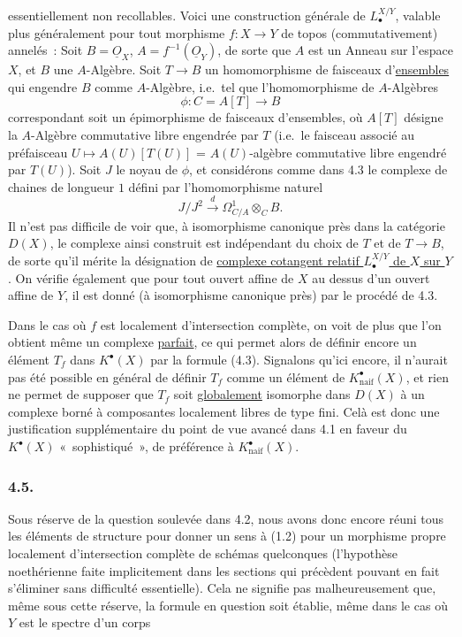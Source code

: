 essentiellement non recollables. Voici une construction g\'en\'erale de $L^{X/Y}_\bullet$, valable plus g\'en\'eralement pour tout morphisme $f:X\to Y$ de topos (commutativement) annel\'es~: Soit $B=\underline O_X$, $A=f^{-1}(\underline O_Y)$, de sorte que $A$ est un Anneau sur l'espace $X$, et $B$ une $A$-Alg\`ebre. Soit $T\to B$ un homomorphisme de faisceaux d'\underline{ensembles} qui engendre $B$ comme $A$-Alg\`ebre, i.e.\ tel que l'homomorphisme de $A$-Alg\`ebres
\[
\phi:C=A[T]\longrightarrow B
\]
correspondant soit un \'epimorphisme de faisceaux d'ensembles, o\`u $A[T]$ d\'esigne la $A$-Alg\`ebre commutative libre engendr\'ee par $T$ (i.e.\ le faisceau associ\'e au pr\'efaisceau $U\longmapsto A(U)[T(U)]$ = $A(U)$-alg\`ebre commutative libre engendr\'e par $T(U)$).
Soit $J$ le noyau de $\phi$, et consid\'erons comme dans 4.3 le complexe de chaines de longueur $1$ d\'efini par l'homomorphisme naturel
\[
J/J^2\xrightarrow{d}\Omega^1_{C/A}\otimes_C B.
\]
Il n'est pas difficile de voir que, \`a isomorphisme canonique pr\`es dans la cat\'egorie $D(X)$, le complexe ainsi construit est ind\'ependant du choix de $T$ et de $T\to B$, de sorte qu'il m\'erite la d\'esignation de \uline{complexe cotangent relatif $L^{X/Y}_\bullet$ de $X$ sur $Y$}. On v\'erifie \'egalement que pour tout ouvert affine de $X$ au dessus d'un ouvert affine de $Y$, il est donn\'e (\`a isomorphisme canonique pr\`es) par le proc\'ed\'e de 4.3.

Dans le cas o\`u $f$ est localement d'intersection compl\`ete, on voit de plus que l'on obtient m\^eme un complexe \underline{parfait}, ce qui permet alors de d\'efinir encore un \'el\'ement $T_f$ dans $K^\bullet(X)$ par la formule (4.3). Signalons qu'ici encore, il n'aurait pas \'et\'e possible en g\'en\'eral de d\'efinir $T_f$ comme un \'el\'ement de $K^\bullet_{\mathrm{naif}}(X)$, et rien ne permet de supposer que $T_f$ soit \underline{globalement} isomorphe dans $D(X)$ \`a un complexe born\'e \`a composantes localement libres de type fini. Cel\`a est donc une justification suppl\'ementaire du point de vue avanc\'e dans 4.1 en faveur du $K^\bullet(X)$ «~sophistiqu\'e~», de pr\'ef\'erence \`a $K^\bullet_{\mathrm{naif}}(X)$.

\subsubsection*{4.5.}
Sous r\'eserve de la question soulev\'ee dans 4.2, nous avons donc encore r\'euni tous les \'el\'ements de structure pour donner un sens \`a (1.2) pour un morphisme propre localement d'intersection compl\`ete de sch\'emas quelconques (l'hypoth\`ese noeth\'erienne faite implicitement dans les sections qui pr\'ec\`edent pouvant en fait s'\'eliminer sans difficult\'e essentielle). Cela ne signifie pas malheureusement que, m\^eme sous cette r\'eserve, la formule en question soit \'etablie, m\^eme dans le cas o\`u $Y$ est le spectre d'un corps 
